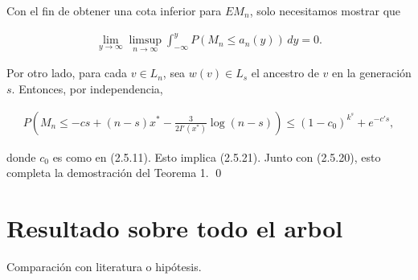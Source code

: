\documentclass[12pt]{report}
\begin{document}
Con el fin de obtener una cota inferior para $EM_n$, solo necesitamos mostrar que

\begin{align}
    \lim_{y \to \infty} \limsup_{n \to \infty} \int_{-\infty}^{y} P(M_n \leq a_n(y)) \, dy = 0. 
\end{align}

Por otro lado, para cada $ v \in L_n $, sea $ w(v) \in L_s $ el ancestro de $v$ en la generación $s$. Entonces, por independencia,

\begin{align}
    P\left(M_n \leq -cs + (n - s)x^* - \frac{3}{2I'(x^*)} \log(n - s) \right) \leq (1 - c_0)^{k^s} + e^{-c's},
\end{align}

donde $ c_0 $ es como en (2.5.11). Esto implica (2.5.21). Junto con (2.5.20), esto completa la demostración del Teorema 1. \qed





\section{Resultado sobre todo el arbol}
Comparación con literatura o hipótesis.
\end{document}
